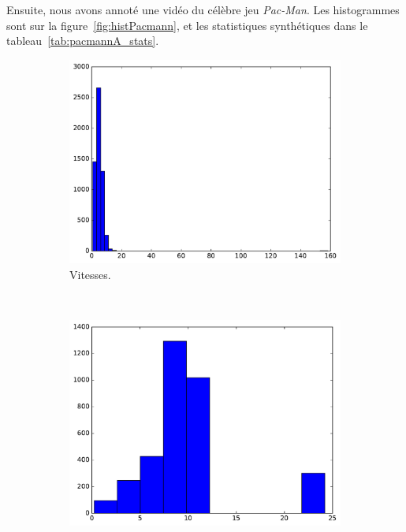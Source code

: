 	Ensuite, nous avons annoté une vidéo du célèbre jeu \emph{Pac-Man}. Les histogrammes sont sur la figure~\ref{fig:histPacmann}, et les statistiques synthétiques dans le tableau~\ref{tab:pacmannA_stats}.
	
	\begin{figure}[!htbp]
		\begin{subfigure}[t]{\subImgWclicks}
			\centering
			\includegraphics[width=\textwidth]{figures/ch3/pacmannA_filteredSpeed}
			\caption{Vitesses.}
			\label{fig:pacmannA_filteredSpeed}
		\end{subfigure}
		~
		\begin{subfigure}[t]{\subImgWclicks}
			\centering
			\includegraphics[width=\textwidth]{figures/ch3/pacmannA_frequency}

\end{subfigure}
\end{figure}
